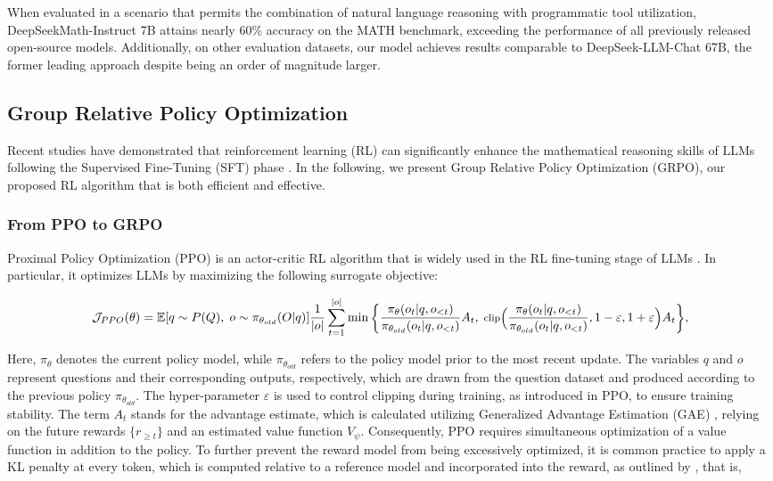 \begin{itemize}[topsep=0pt]
\begin{itemize}[topsep=0pt]
When evaluated in a scenario that permits the combination of natural language reasoning with programmatic tool utilization, DeepSeekMath-Instruct 7B attains nearly 60\% accuracy on the MATH benchmark, exceeding the performance of all previously released open-source models. Additionally, on other evaluation datasets, our model achieves results comparable to DeepSeek-LLM-Chat 67B, the former leading approach despite being an order of magnitude larger.

\subsection{Group Relative Policy Optimization} Recent studies have demonstrated that reinforcement learning (RL) can significantly enhance the mathematical reasoning skills of LLMs following the Supervised Fine-Tuning (SFT) phase \citep{wang2023math,wizardmath}. In the following, we present Group Relative Policy Optimization (GRPO), our proposed RL algorithm that is both efficient and effective.

\subsubsection{From PPO to GRPO} Proximal Policy Optimization (PPO) \citep{schulman2017proximal} is an actor-critic RL algorithm that is widely used in the RL fine-tuning stage of LLMs \citep{ouyang2022training}. In particular, it optimizes LLMs by maximizing the following surrogate objective:

\begin{equation}
\footnotesize
    \mathcal{J}_{PPO}(\theta) = \mathbb{E}{[q \sim P(Q),\; o \sim \pi_{\theta_{old}}(O|q)]} \frac{1}{|o|} \sum_{t=1}^{|o|} \min \Bigg\{ \frac{\pi_\theta(o_{t} | q, o_{<t})}{\pi_{\theta_{old}}(o_{t} | q, o_{<t})} A_{t},\; \text{clip}\Big( \frac{\pi_\theta(o_{t} | q, o_{<t})}{\pi_{\theta_{old}}(o_{t} | q, o_{<t})}, 1 - \varepsilon, 1 + \varepsilon \Big)  A_{t} \Bigg\} ,
\end{equation}

Here, $\pi_{\theta}$ denotes the current policy model, while $\pi_{\theta_{old}}$ refers to the policy model prior to the most recent update. The variables $q$ and $o$ represent questions and their corresponding outputs, respectively, which are drawn from the question dataset and produced according to the previous policy $\pi_{\theta_{old}}$. The hyper-parameter $\varepsilon$ is used to control clipping during training, as introduced in PPO, to ensure training stability. The term $A_t$ stands for the advantage estimate, which is calculated utilizing Generalized Advantage Estimation (GAE) \citep{gae}, relying on the future rewards $\{r_{\ge t}\}$ and an estimated value function $V_{\psi}$. Consequently, PPO requires simultaneous optimization of a value function in addition to the policy. To further prevent the reward model from being excessively optimized, it is common practice to apply a KL penalty at every token, which is computed relative to a reference model and incorporated into the reward, as outlined by \citep{ouyang2022training}, that is,


\end{itemize}
\end{itemize}
